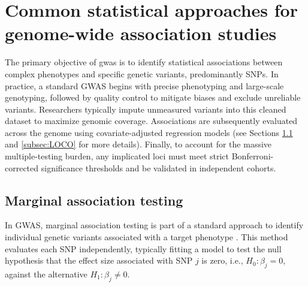 
\section{Common statistical approaches for genome-wide association studies}

The primary objective of \gls{gwas} is to identify statistical associations between complex phenotypes and specific genetic variants, predominantly SNPs. In practice, a standard GWAS begins with precise phenotyping and large-scale genotyping, followed by quality control to mitigate biases and exclude unreliable variants. Researchers typically impute unmeasured variants into this cleaned dataset to maximize genomic coverage. Associations are subsequently evaluated across the genome using covariate-adjusted regression models (see Sections \ref{subsec:marginal_testing} and \ref{subsec:LOCO} for more details). Finally, to account for the massive multiple-testing burden, any implicated loci must meet strict Bonferroni-corrected significance thresholds and be validated in independent cohorts.

\subsection{Marginal association testing}
\label{subsec:marginal_testing}
In GWAS, marginal association testing is part of a standard approach to identify individual genetic variants associated with a target phenotype \cite{Sesia2021}. This method evaluates each SNP independently, typically fitting a model to test the null hypothesis that the effect size associated with SNP $j$ is zero, i.e., \( H_0: \beta_j = 0 \), against the alternative $H_1: \beta_j \neq 0$.

